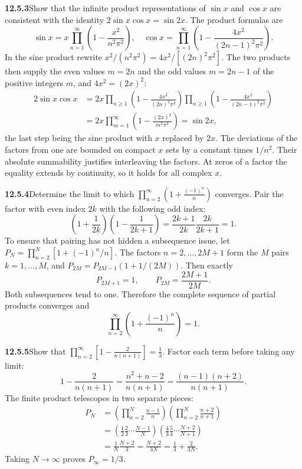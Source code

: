 \par\bigskip
\noindent\textbf{12.5.3}\quad Show that the infinite product representations
of $\sin x$ and $\cos x$ are consistent with the identity
$2\sin x\cos x=\sin2x$.
\solution
The product formulas are
\[
\sin x=x\prod_{n=1}^{\infty}\left(1-\frac{x^2}{n^2\pi^2}\right),\quad
\cos x=\prod_{n=1}^{\infty}
 \left(1-\frac{4x^2}{(2n-1)^2\pi^2}\right).
\]
In the sine product rewrite $x^2/(n^2\pi^2)=4x^2/[(2n)^2\pi^2]$.
The two products then supply the even values $m=2n$ and the odd values
$m=2n-1$ of the positive integers $m$, and $4x^2=(2x)^2$:
\begin{align*}
2\sin x\cos x
&=2x\prod_{n\ge1}\left(1-\frac{4x^2}{(2n)^2\pi^2}\right)
       \prod_{n\ge1}\left(1-\frac{4x^2}{(2n-1)^2\pi^2}\right)\\
&=2x\prod_{m=1}^{\infty}\left(1-\frac{(2x)^2}{m^2\pi^2}\right)
=\boxed{\sin2x},
\end{align*}
the last step being the sine product with $x$ replaced by $2x$.
The deviations of the factors from one are bounded on compact $x$ sets
by a constant times $1/n^2$. Their absolute summability justifies
interleaving the factors. At zeros of a factor the equality extends
by continuity, so it holds for all complex $x$.

\par\bigskip
\noindent\textbf{12.5.4}\quad Determine the limit to which
$\displaystyle\prod_{n=2}^{\infty}\left(1+\frac{(-1)^{n}}{n}\right)$
converges.
\solution
Pair the factor with even index $2k$ with the following odd index:
\[
\left(1+\frac1{2k}\right)
\left(1-\frac1{2k+1}\right)
=\frac{2k+1}{2k}\frac{2k}{2k+1}=1.
\]
To ensure that pairing has not hidden a subsequence issue, let
$P_N=\prod_{n=2}^N[1+(-1)^n/n]$. The factors $n=2,\ldots,2M+1$ form the
$M$ pairs $k=1,\ldots,M$, and $P_{2M}=P_{2M-1}(1+1/(2M))$. Then exactly
\[
P_{2M+1}=1,\qquad P_{2M}=\frac{2M+1}{2M}.
\]
Both subsequences tend to one. Therefore the complete sequence of
partial products converges and
\[
\boxed{\prod_{n=2}^{\infty}\left(1+\frac{(-1)^n}{n}\right)=1}.
\]

\par\bigskip
\noindent\textbf{12.5.5}\quad Show that
$\displaystyle\prod_{n=2}^{\infty}\left[1-\frac{2}{n(n+1)}\right]
=\frac{1}{3}$.
\solution
Factor each term before taking any limit:
\[
1-\frac2{n(n+1)}
=\frac{n^2+n-2}{n(n+1)}
=\frac{(n-1)(n+2)}{n(n+1)}.
\]
The finite product telescopes in two separate pieces:
\begin{align*}
P_N&=\left(\prod_{n=2}^N\frac{n-1}{n}\right)
     \left(\prod_{n=2}^N\frac{n+2}{n+1}\right)\\
&=\left(\frac12\frac23\cdots\frac{N-1}{N}\right)
  \left(\frac43\frac54\cdots\frac{N+2}{N+1}\right)\\
&=\frac1N\frac{N+2}{3}=\frac{N+2}{3N}=\frac13+\frac2{3N}.
\end{align*}
Taking $N\to\infty$ proves $\boxed{P_\infty=1/3}$.

